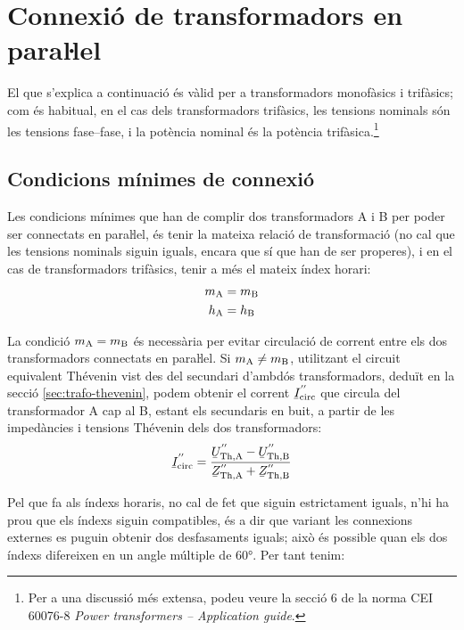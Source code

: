 \section{\texorpdfstring{Connexió de transformadors en paraŀlel}{Connexió de transformadors en paral-lel}}

El que s'explica a continuació és vàlid per a transformadors
monofàsics i trifàsics; com és habitual, en el cas dels
transformadors trifàsics, les tensions nominals són les tensions
fase--fase, i la potència nominal és la potència trifàsica.\footnote{Per a una discussió més extensa,  podeu veure la secció 6 de la norma CEI 60076-8 \emph{Power transformers -- Application guide}.}

\subsection{Condicions mínimes de connexió}

Les condicions mínimes que han de complir dos transformadors A i B per poder ser connectats en paraŀlel, és tenir la mateixa relació de transformació (no cal que les tensions nominals siguin iguals, encara que sí que han de ser properes), i en el cas de transformadors trifàsics, tenir a més el mateix índex horari:
\begin{align}
    m_\mathrm{A} &= m_\mathrm{B}\\
    h_\mathrm{A} &= h_\mathrm{B}
\end{align}

La condició $m_\mathrm{A} = m_\mathrm{B}$ és necessària per evitar circulació de corrent entre els dos transformadors connectats en paraŀlel. Si $m_\mathrm{A} \neq m_\mathrm{B}$, utilitzant el circuit equivalent  Thévenin vist des del secundari d'ambdós transformadors, deduït en la secció \vref{sec:trafo-thevenin}, podem obtenir el corrent $\cmplx{I}\ped{circ}^{''}$ que circula del transformador A cap al B, estant els secundaris en buit, a partir de les impedàncies i tensions Thévenin dels dos transformadors:
\begin{equation}
    \cmplx{I}\ped{circ}^{''} = \frac{\cmplx{U}\ped{Th,A}^{''}-\cmplx{U}\ped{Th,B}^{''}}{\cmplx{Z}\ped{Th,A}^{''}+
    \cmplx{Z}\ped{Th,B}^{''}}
\end{equation}

Pel que fa als índexs horaris, no cal de fet que siguin estrictament iguals, n'hi ha prou  que els índexs siguin compatibles, és a dir que variant les connexions externes es puguin obtenir dos desfasaments iguals; això és possible quan els dos índexs difereixen en un angle múltiple de \ang{60}. Per tant tenim:

